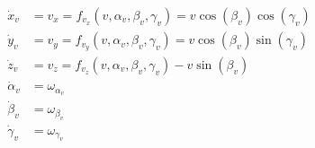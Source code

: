 \begin{equation}\label{eq:simple3ddifferentialequations}
    \begin{aligned}
        \dot{x}_v &= v_x  =f_{v_x}(v,\alpha_v,\beta_v,\gamma_v) = v\cos(\beta_v)\cos(\gamma_v)\\
        \dot{y}_v &= v_y  =f_{v_y}(v,\alpha_v,\beta_v,\gamma_v) = v\cos(\beta_v)\sin(\gamma_v)\\
        \dot{z}_v &= v_z  =f_{v_z}(v,\alpha_v,\beta_v,\gamma_v) -v\sin(\beta_v)\\
        \dot{\alpha}_v &= \omega_{\alpha_v}\\
        \dot{\beta}_v &= \omega_{\beta_v}\\
        \dot{\gamma}_v &= \omega_{\gamma_v}\\
    \end{aligned}
\end{equation}

